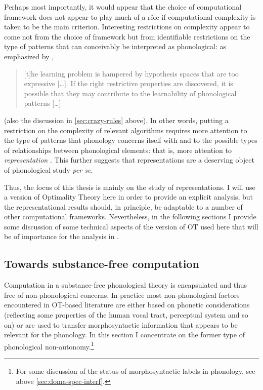 Perhaps most importantly, it would appear that the choice of computational framework does not appear to play much of a rôle if computational complexity is taken to be the main criterion. Interesting restrictions on complexity appear to come not from the choice of framework but from identifiable restrictions on the type of patterns that can conceivably be interpreted as phonological: as emphasized by \citet[p.~162]{Heinz-2011-CPGLF}, \blockquote{[t]he learning problem is hampered by hypothesis spaces that are too expressive [\ldots]. If the right restrictive properties are discovered, it is possible that they may contribute to the learnability of phonological patterns [\ldots]} (\cf also the discussion in \cref{sec:crazy-rules} above). In other words, putting a restriction on the complexity of relevant algorithms requires more attention to the type of patterns that phonology concerns itself with and to the possible types of relationships between phonological elements: that is, more attention to \emph{representation} \citep{wareham98:_system,heinz11:_tier_stric_local_const_phonol}. This further suggests that representations are a deserving object of phonological study \emph{per se}.

Thus, the focus of this thesis is mainly on the study of representations. I will use a version of Optimality Theory here in order to provide an explicit analysis, but the representational results should, in principle, be adaptable to a number of other computational frameworks. Nevertheless, in the following sections I provide some discussion of some technical aspects of the version of OT used here that will be of importance for the analysis in .

\subsection{Towards substance-free computation}
\label{sec:subst-free-comp}

Computation in a substance\hyp free phonological theory is encapsulated and thus free of non\hyp phonological concerns. In practice most non\hyp phonological factors encountered in OT\hyp based literature are either based on phonetic considerations (reflecting some properties of the human vocal tract, perceptual system and so on) or are used to transfer morphosyntactic information that appears to be relevant for the phonology. In this section I concentrate on the former type of phonological non\hyp autonomy.\footnote{For some discussion of the status of morphosyntactic labels in phonology, see above \cref{sec:doma-spec-interf}.}

